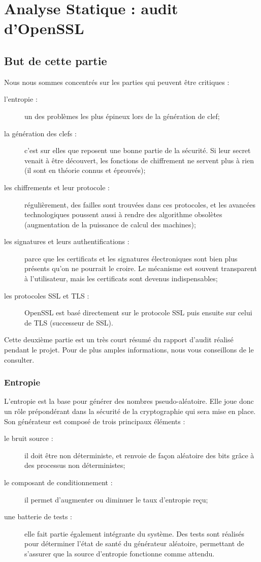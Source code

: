 \chapter{Analyse Statique : audit d'OpenSSL}

\section{But de cette partie}
Nous nous sommes concentrés sur les parties qui peuvent être critiques : 
\begin{description}
	\item [l'entropie :] un des problèmes les plus épineux lors de la génération de clef;
	\item [la génération des clefs : ] c'est sur elles que reposent une bonne partie de la sécurité. Si leur secret venait à être découvert, les fonctions de chiffrement ne servent plus à rien (il sont en théorie connus et éprouvés);
	\item [les chiffrements et leur protocole :] régulièrement, des failles sont trouvées dans ces protocoles, et les avancées technologiques poussent aussi à rendre des algorithme obsolètes (augmentation de la puissance de calcul des machines);
	\item [les signatures et leurs authentifications : ] parce que les certificats et les signatures électroniques sont bien plus présents qu'on ne pourrait le croire. Le mécanisme est souvent transparent à l'utilisateur, mais les certificats sont devenus indispensables;
	\item [les protocoles SSL et TLS : ] OpenSSL est basé directement sur le protocole SSL puis ensuite sur celui de TLS (successeur de SSL).\\
\end{description}
Cette deuxième partie est un très court résumé du rapport d'audit réalisé pendant le projet. Pour de plus amples informations, nous vous conseillons de le consulter.

\subsection{Entropie}

L'entropie est la base pour générer des nombres pseudo-aléatoire. Elle joue donc un rôle prépondérant dans la sécurité de la cryptographie qui sera mise en place. Son générateur est composé de trois principaux éléments : 
\begin{description}
	\item [le bruit source : ] il doit être non déterministe, et renvoie de façon aléatoire des bits grâce à des processus non déterministes;
	\item [le composant de conditionnement : ] il permet d’augmenter ou diminuer le taux d’entropie reçu;
	\item [une batterie de tests : ] elle fait partie également intégrante du système. Des tests sont réalisés pour déterminer l’état de santé du générateur aléatoire, permettant de s’assurer que la source d’entropie fonctionne comme attendu.\\
\end{description}

